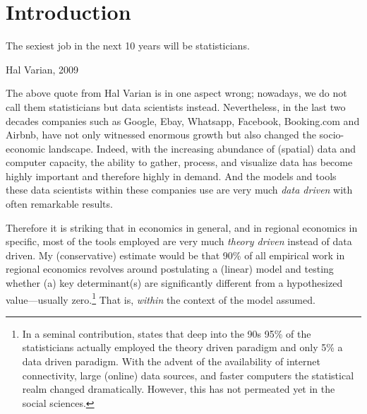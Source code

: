 \documentclass[fleqn,10pt]{SelfArx} %
\affiliation{\textsuperscript{1}\textit{Department of Spatial Economics, Vrije Universiteit Amsterdam, Amsterdam, The Netherlands}} %
\affiliation{*\textbf{Corresponding author}: \Letter{} t.de.graaff@vu.n; \Mundus{} \href{thomasdegraaff.nl}{thomasdegraaff.nl}} %
\begin{document}
\flushbottom %
\maketitle %
\tableofcontents %
\thispagestyle{empty} %


\section*{Introduction} %


\epigraph{The sexiest job in the next 10 years will be statisticians.}{Hal Varian, 2009}

The above quote from Hal Varian is in one aspect wrong; nowadays, we do not call them statisticians but data scientists instead. Nevertheless, in the last two decades companies such as Google, Ebay, Whatsapp, Facebook, Booking.com and Airbnb, have not only witnessed enormous growth but also changed the socio-economic landscape. Indeed, with the increasing abundance of (spatial) data and computer capacity, the ability to gather, process, and visualize data has become highly important and therefore highly in demand. And the models and tools these data scientists within these companies use are very much \textit{data driven} with often remarkable results. 

Therefore it is striking that in economics in general, and in regional economics in specific, most of the tools employed are very much \textit{theory driven} instead of data driven. My (conservative) estimate would be that 90\% of all empirical work in regional economics revolves around postulating a (linear) model and testing whether (a) key determinant(s) are significantly different from a hypothesized value---usually zero.\footnote{In a seminal contribution, \cite{breiman2001statistical} states that deep into the 90s 95\% of the statisticians actually employed the theory driven paradigm and only 5\% a data driven paradigm. With the advent of the availability of internet connectivity, large (online) data sources, and faster computers the statistical realm changed dramatically. However, this has not permeated yet in the social sciences.} That is, \textit{within} the context of the model assumed.
\end{document}
